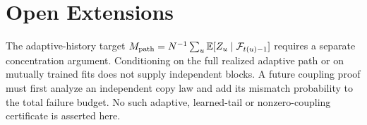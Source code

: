 \section{Open Extensions}
The adaptive-history target $M_{\rm path}=N^{-1}\sum_u\mathbb{E}[Z_u\mid\mathcal F_{t(u)-1}]$ requires a separate concentration argument. Conditioning on the full realized adaptive path or on mutually trained fits does not supply independent blocks. A future coupling proof must first analyze an independent copy law and add its mismatch probability to the total failure budget. No such adaptive, learned-tail or nonzero-coupling certificate is asserted here.
